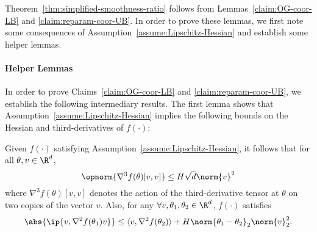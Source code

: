 

Theorem~\ref{thm:simplified-smoothness-ratio} follows from Lemmas~\ref{claim:OG-coor-LB} and \ref{claim:reparam-coor-UB}. In order to prove these lemmas, we first note some consequences of Assumption~\ref{assume:Lipschitz-Hessian} and establish some helper lemmas.

\paragraph{Helper Lemmas} In order to prove Claims~\ref{claim:OG-coor-LB} and \ref{claim:reparam-coor-UB}, we establish the following intermediary results. The first lemma shows that Assumption~\ref{assume:Lipschitz-Hessian} implies the following bounds on the Hessian and third-derivatives of $f(\cdot)$:
\begin{lemma}\label{lemma:Lipschitz-Hessian-consequences}
    Given $f(\cdot)$ satisfying Assumption~\ref{assume:Lipschitz-Hessian}, it follows that for all $\theta, v\in \R^d$,
    \[
        \opnorm{\nabla^3 f(\theta)[v,v]} \leq H \sqrt{d}\norm{v}^2
    \]
    where $\nabla^3 f(\theta)[v,v]$ denotes the action of the third-derivative tensor at $\theta$ on two copies of the vector $v$. Also, for any $\forall v, \theta_1, \theta_2\in \R^d$, $f(\cdot)$ satisfies 
    \[
        \abs{\ip{v, \nabla^2 f(\theta_1)v}} \leq \langle v, \nabla^2 f(\theta_2)\rangle  + H\norm{\theta_1-\theta_2}_2 \norm{v}^2_2.
    \]
\end{lemma}
